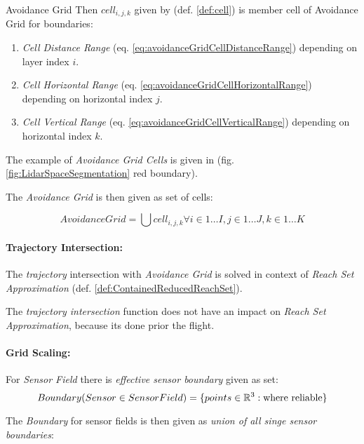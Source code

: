 \begin{definition}{Avoidance Grid}
Then $cell_{i,j,k}$ given by (def. \ref{def:cell}) is member cell of Avoidance Grid for boundaries:
\begin{enumerate}
    \item \emph{Cell Distance Range} (eq. \ref{eq:avoidanceGridCellDistanceRange}) depending on layer index $i$.
    
    \item \emph{Cell Horizontal Range} (eq. \ref{eq:avoidanceGridCellHorizontalRange}) depending on horizontal index $j$.
    
    \item \emph{Cell Vertical Range} (eq. \ref{eq:avoidanceGridCellVerticalRange}) depending on horizontal index $k$.
\end{enumerate}

\noindent The example of \emph{Avoidance Grid Cells} is given in (fig. \ref{fig:LidarSpaceSegmentation} red boundary). 

The \emph{Avoidance Grid} is then given as set of cells:

\begin{equation}\label{eq:avoidanceGridCellSpace}
    Avoidance Grid = \bigcup cell_{i,j,k} \forall i \in 1\dots I, j\in 1\dots J, k\in 1\dots K
\end{equation}
\end{definition}

\paragraph{Trajectory Intersection:} The \emph{trajectory} intersection with \emph{Avoidance Grid} is solved in context of \emph{Reach Set Approximation} (def. \ref{def:ContainedReducedReachSet}). 
\begin{note}
    The \emph{trajectory intersection} function does not have an impact on \emph{Reach Set Approximation}, because its done prior the flight.
\end{note}


\paragraph{Grid Scaling:} For \emph{Sensor Field} there is \emph{effective sensor boundary} given as set:
\begin{equation}
    Boundary(Sensor \in Sensor Field) = \{points \in \mathbb{R}^3: \text{where reliable}\}
\end{equation}

\noindent The \emph{Boundary} for sensor fields is then given as \emph{union of all singe sensor boundaries}:

